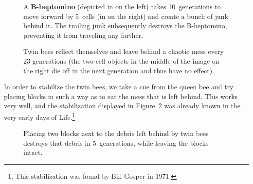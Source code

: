 \begin{figure}[!htb]
	\centering
	\begin{minipage}[b]{0.46\textwidth}
		\centering{}
		\caption{A \textbf{B-heptomino} (depicted in  on the left) takes 10~generations to move forward by 5~cells (in  on the right) and create a bunch of junk behind it. The trailing junk subsequently destroys the B-heptomino, preventing it from traveling any farther.}\label{fig:b_heptomino_10}
	\end{minipage}\hfill
	\begin{minipage}[b]{0.5\textwidth}
		\centering{}
		\caption{Twin bees reflect themselves and leave behind a chaotic mess every 23 generations (the two-cell objects in the middle of the image on the right die off in the next generation and thus have no effect).}\label{fig:twin_bees}
	\end{minipage}
\end{figure}

In order to stabilize the twin bees, we take a cue from the queen bee and try placing blocks in such a way as to eat the mess that is left behind. This works very well, and the stabilization displayed in Figure~\ref{fig:twin_bees_debris_eat} was already known in the very early days of Life.\footnote{This stabilization was found by Bill Gosper in 1971.}

\begin{figure}[!htb]
	\centering
	\caption{Placing two blocks next to the debris left behind by twin bees destroys that debris in 5~generations, while leaving the blocks intact.}\label{fig:twin_bees_debris_eat}
\end{figure}

